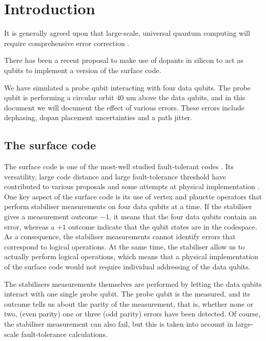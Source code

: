 
\section{Introduction} \label{sec:Introduction}

It is generally agreed upon that large-scale, universal quantum computing will require comprehensive error correction \cite{Wang2011,Fowler2012}.





There has been a recent proposal to make use of dopants in silicon to act as qubits \cite{the paper} to implement a version of the surface code. 


We have simulated a probe qubit interacting with four data qubits. The probe qubit is performing a circular orbit $40$ nm above the data qubits, and in this document we will document the effect of various errors. These errors include dephasing, dopan placement uncertainties and a path jitter. 


\subsection{The surface code}
The surface code is one of the most-well studied fault-tolerant codes \cite{something}. Its versatility, large code distance and large fault-tolerance threshold have contributed to various proposals \cite{some review} and some attempts at physical implementation \cite{Martinis?}. One key aspect of the surface code is its use of vertex and plauette operators that perform stabiliser measurements on four data qubits at a time. If the stabiliser gives a measurement outcome $-1$, it means that the four data qubits contain an error, whereas a $+1$ outcome indicate that the qubit states are in the codespace. As a consequence, the stabiliser measurements cannot identify errors that correspond to logical operations. At the same time, the stabiliser allow us to actually perform logical operations, which means that a physical implementation of the surface code would not require individual addressing of the data qubits. 

The stabilisers measurements themselves are performed by letting the data qubits interact with one single probe qubit. The probe qubit is the measured, and its outcome tells us about the parity of the measurement, that is, whether none or two,  (even parity) one  or three (odd parity) errors have been detected. Of course, the stabiliser measurement can also fail, but this is taken into account in large-scale fault-tolerance calculations. 




